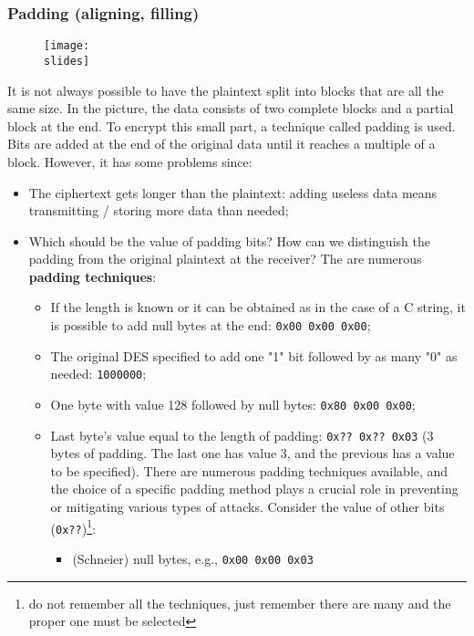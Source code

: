 \subsubsection*{Padding (aligning, filling)}
\begin{figure}[H]
    \centering
    \texttt{[image: \\slides]}
\end{figure}
It is not always possible to have the plaintext split into blocks that are all the same size. In the picture, the data consists of two complete blocks and a partial block at the end. To encrypt this small part, a technique called padding is used. Bits are added at the end of the original data until it reaches a multiple of a block.
However, it has some problems since:
\begin{itemize}
    \item The ciphertext gets longer than the plaintext: adding useless data means transmitting / storing more data
          than needed;
    \item Which should be the value of padding bits? How can we distinguish the padding from the original
          plaintext at the receiver?
          The are numerous \textbf{padding techniques}:
          \begin{itemize}
              \item If the length is known or it can be obtained as in the case of a C string, it is possible to add null bytes
                    at the end: \texttt{0x00 0x00 0x00};
              \item The original DES specified to add one "1" bit followed by as many "0" as needed: \texttt{1000000};
              \item One byte with value 128 followed by null bytes: \texttt{0x80 0x00 0x00};
              \item Last byte's value equal to the length of padding: \texttt{0x?? 0x?? 0x03} (3 bytes of padding. The last one
                    has value 3, and the previous has a value to be specified).
                    There are numerous padding techniques available, and the choice of a specific padding method plays a crucial role in preventing or mitigating various types of attacks.
                    Consider the value of other bits (\texttt{0x??})\footnote{do not remember all the techniques, just remember there
                        are many and the proper one must be selected}:
                    \begin{itemize}
                        \item (Schneier) null bytes, e.g., \texttt{0x00 0x00 0x03}

\end{itemize}
\end{itemize}
\end{itemize}
